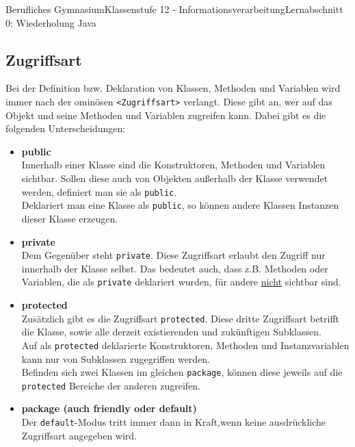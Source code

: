 \documentclass[11pt,oneside,openany,headings=optiontotoc,11pt,numbers=noenddot]{article}
\begin{document}
\begin{worksheet}{Berufliches Gymnasium}{Klassenstufe 12 - Informationsverarbeitung}{Lernabschnitt 0: Wiederholung Java}
		\subsection{Zugriffsart}
		Bei der Definition bzw. Deklaration von Klassen, Methoden und Variablen wird immer nach der ominösen \lstinline[style=JavaInputStyle]{<Zugriffsart>} verlangt. Diese gibt an, wer auf das Objekt und seine Methoden und Variablen zugreifen kann. Dabei gibt es die folgenden Unterscheidungen:
		\begin{itemize}
			\item \textbf{public}\\
			Innerhalb einer Klasse sind die Konstruktoren, Methoden und Variablen sichtbar. Sollen diese auch von Objekten außerhalb der Klasse verwendet werden, definiert man sie als \lstinline[style=JavaInputStyle]{public}.\\
			Deklariert man eine Klasse als \lstinline[style=JavaInputStyle]{public}, so können andere Klassen Instanzen dieser Klasse erzeugen.
			\item \textbf{private}\\
			Dem Gegenüber steht \lstinline[style=JavaInputStyle]{private}. Diese Zugriffsart erlaubt den Zugriff nur innerhalb der Klasse selbst. Das bedeutet auch, dass z.B. Methoden oder Variablen, die als \lstinline[style=JavaInputStyle]{private} deklariert wurden, für andere \underline{nicht} sichtbar sind.
			\item \textbf{protected}\\
			Zusätzlich gibt es die Zugriffsart \lstinline[style=JavaInputStyle]{protected}. Diese dritte Zugriffsart betrifft die Klasse, sowie alle derzeit existierenden und zukünftigen Subklassen.\\
			Auf als \lstinline[style=JavaInputStyle]{protected} deklarierte Konstruktoren, Methoden und Instanzvariablen kann nur von Subklassen zugegriffen werden.\\
			Befinden sich zwei Klassen im gleichen \lstinline[style=JavaInputStyle]{package}, können diese jeweils auf die \lstinline[style=JavaInputStyle]{protected} Bereiche der anderen zugreifen.
			\item \textbf{package (auch friendly oder default)}\\			
			Der \lstinline[style=JavaInputStyle]{default}-Modus tritt immer dann in Kraft,wenn keine ausdrückliche Zugriffsart angegeben wird.\\
		\end{itemize}
		\begin{tabularx}{\textwidth}{cX}

\end{tabularx}
\end{worksheet}
\end{document}
